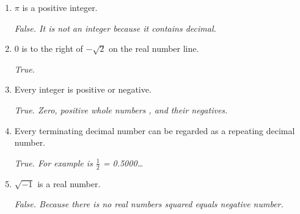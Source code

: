 \documentclass{article}
\begin{document}
\begin{enumerate}
    \item $\pi$ is a positive integer.\par
    \textit{
        False. It is not an integer because it contains decimal.
    }\par

    \item $0$ is to the right of $-\sqrt{2}$ on the real number line.\par
    \textit{
        True.
    }\par

    \item Every integer is positive or negative.\par
    \textit{
        True. Zero, positive whole numbers
        , and their negatives.
    }\par

    \item Every terminating decimal number can be regarded as a repeating decimal number.\par
    \textit{
        True. For example is $\frac{1}{2}$ = 0.5000\dots
    }\par

    \item $\sqrt{-1}$ is a real number.\par
    \textit{
        False. Because there is no real numbers squared equals negative number.
    }\par
\end{enumerate}
\end{document}
